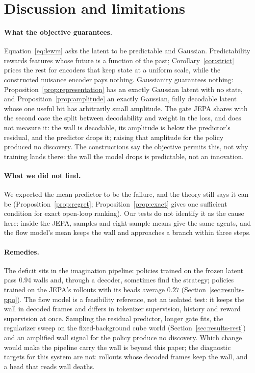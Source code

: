\section{Discussion and limitations}
\label{sec:limitations}

\paragraph{What the objective guarantees.} Equation~\ref{eq:lewm} asks the latent to be predictable
and Gaussian. Predictability rewards features whose future is a function of the past; Corollary~\ref{cor:strict} prices the rest for encoders that keep state at a uniform scale, while the constructed nuisance encoder pays nothing. Gaussianity guarantees nothing: Proposition~\ref{prop:representation} has an exactly Gaussian latent with no
state, and Proposition~\ref{prop:amplitude} an exactly Gaussian, fully decodable latent whose one useful
bit has arbitrarily small amplitude. The gate JEPA shares with the second case the split between decodability and weight in the loss, and does not measure it: the wall is decodable, its amplitude is below the predictor's residual, and the predictor drops it; raising that amplitude for the policy produced no discovery. The constructions say the objective permits this, not why training lands there: the wall the model drops is predictable, not an innovation.

\paragraph{What we did not find.} We expected the mean predictor to be the failure, and the theory
still says it can be (Proposition~\ref{prop:regret}; Proposition~\ref{prop:exact} gives one sufficient condition for exact open-loop ranking). Our tests do not identify it as the cause here: inside the JEPA, samples and eight-sample means give the same agents, and the flow model's mean keeps the wall and approaches a branch within three steps.

\paragraph{Remedies.} The deficit sits in the imagination pipeline: policies trained on the frozen latent pass $0.94$ walls and, through a decoder, sometimes find the strategy; policies trained on the JEPA's rollouts with its heads average $0.27$ (Section~\ref{sec:results-ppo}). The flow model is a feasibility reference, not an isolated test: it keeps the wall in decoded frames and differs in tokenizer supervision, history and reward supervision at once. Sampling the residual predictor, longer gate fits, the regularizer sweep on the fixed-background cube world (Section~\ref{sec:results-rest}) and an amplified wall signal for the policy produce no discovery. Which change would make the pipeline carry the wall is beyond this paper; the diagnostic targets for this system are not: rollouts whose decoded frames keep the wall, and a head that reads wall deaths.

